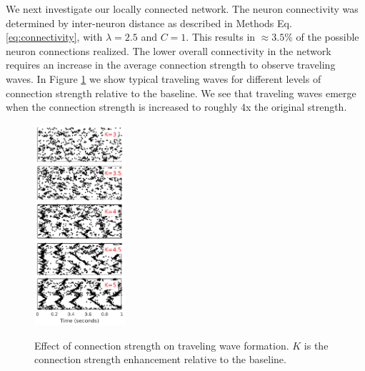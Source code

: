 \documentclass[a4paper,11pt]{article}
\begin{document}
We next investigate our locally connected network.
The neuron connectivity was determined by inter-neuron distance as described in Methods Eq. \ref{eq:connectivity}, with $\lambda=2.5$ and $C=1$.
This results in $\approx 3.5\%$ of the possible neuron connections realized.  
The lower overall connectivity in the network requires an increase in the average connection strength to observe traveling waves.
In Figure \ref{fig:strength_effect} we show typical traveling waves for different levels of connection strength relative to the baseline.
We see that traveling waves emerge when the connection strength is increased to roughly 4x the original strength.
\begin{figure}[!htb]
 \caption{Effect of connection strength on traveling wave formation. $K$ is the connection strength enhancement relative to the baseline.}
 \centering
   \includegraphics[width=0.3\textwidth]{fig/ConnectionStrengthWaves}  
 \label{fig:strength_effect}
\end{figure}
\end{document}
